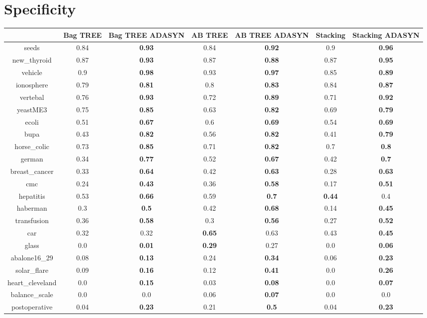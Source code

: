 \documentclass{article}%
\begin{document}
%
\section*{Specificity}%
\begin{tabular}{c|cccccc}%
&Bag TREE&Bag TREE ADASYN&AB TREE&AB TREE ADASYN&Stacking&Stacking ADASYN\\%
\hline%
seeds&0.84&\textbf{0.93}&0.84&\textbf{0.92}&0.9&\textbf{0.96}\\%
new\_thyroid&0.87&\textbf{0.93}&0.87&\textbf{0.88}&0.87&\textbf{0.95}\\%
vehicle&0.9&\textbf{0.98}&0.93&\textbf{0.97}&0.85&\textbf{0.89}\\%
ionosphere&0.79&\textbf{0.81}&0.8&\textbf{0.83}&0.84&\textbf{0.87}\\%
vertebal&0.76&\textbf{0.93}&0.72&\textbf{0.89}&0.71&\textbf{0.92}\\%
yeastME3&0.75&\textbf{0.85}&0.63&\textbf{0.82}&0.69&\textbf{0.79}\\%
ecoli&0.51&\textbf{0.67}&0.6&\textbf{0.69}&0.54&\textbf{0.69}\\%
bupa&0.43&\textbf{0.82}&0.56&\textbf{0.82}&0.41&\textbf{0.79}\\%
horse\_colic&0.73&\textbf{0.85}&0.71&\textbf{0.82}&0.7&\textbf{0.8}\\%
german&0.34&\textbf{0.77}&0.52&\textbf{0.67}&0.42&\textbf{0.7}\\%
breast\_cancer&0.33&\textbf{0.64}&0.42&\textbf{0.63}&0.28&\textbf{0.63}\\%
cmc&0.24&\textbf{0.43}&0.36&\textbf{0.58}&0.17&\textbf{0.51}\\%
hepatitis&0.53&\textbf{0.66}&0.59&\textbf{0.7}&\textbf{0.44}&0.4\\%
haberman&0.3&\textbf{0.5}&0.42&\textbf{0.68}&0.14&\textbf{0.45}\\%
transfusion&0.36&\textbf{0.58}&0.3&\textbf{0.56}&0.27&\textbf{0.52}\\%
car&0.32&0.32&\textbf{0.65}&0.63&0.43&\textbf{0.45}\\%
glass&0.0&\textbf{0.01}&\textbf{0.29}&0.27&0.0&\textbf{0.06}\\%
abalone16\_29&0.08&\textbf{0.13}&0.24&\textbf{0.34}&0.06&\textbf{0.23}\\%
solar\_flare&0.09&\textbf{0.16}&0.12&\textbf{0.41}&0.0&\textbf{0.26}\\%
heart\_cleveland&0.0&\textbf{0.15}&0.03&\textbf{0.08}&0.0&\textbf{0.07}\\%
balance\_scale&0.0&0.0&0.06&\textbf{0.07}&0.0&0.0\\%
postoperative&0.04&\textbf{0.23}&0.21&\textbf{0.5}&0.04&\textbf{0.23}\\%
\end{tabular}
\end{document}
